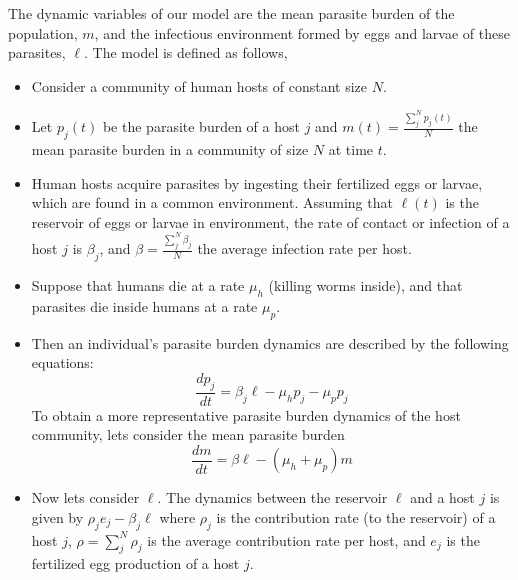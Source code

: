 \documentclass[12pt,a4paper]{article}
\theoremstyle{plain}%
\theoremstyle{definition}
\theoremstyle{remark}
\begin{document}
The dynamic variables of our model are the mean parasite burden of the population, $m$, and the infectious environment formed by eggs and larvae of these parasites, $\ell$.
The model is defined as follows,
\begin{itemize}
	\item Consider a community of human hosts of constant size $N$.
	\item %
	Let $p_j (t)$ be the parasite burden of a host $j$ and
	$m(t)=\frac{\sum^N_j p_j (t)}{N}$ the mean parasite burden in a
	community of size $N$ at time $t$.
	\item Human hosts acquire parasites by ingesting their fertilized eggs or larvae, which are found in a common environment.
	Assuming that $\ell(t)$ is the reservoir of eggs or larvae in environment, the rate of contact or infection of a host $j$ is $\beta_j$, and $\beta=\frac{\sum^N_j \beta_j}{N}$ the average infection rate per host.
	\item Suppose that humans die at a rate $\mu_h$ (killing worms inside), and that parasites die inside humans at a rate $\mu_p$.
	\item Then an individual’s parasite burden dynamics are described by the following equations:
	\begin{equation}
	 \dfrac{dp_j}{dt}=\beta_j \ell - \mu_h p_j - \mu_p p_j
	\end{equation}
	To obtain a more representative parasite burden dynamics of the host community, lets consider the mean parasite burden
	\begin{equation}
	\dfrac{dm}{dt}=\beta \ell - (\mu_h+\mu_p)m
	\end{equation}
	\item Now lets consider $\ell$. 
	The dynamics between the reservoir $\ell$ and a host $j$ is given by
	$\rho_je_j-\beta_j \ell$
	where $\rho_j$ is the contribution rate (to the reservoir) of a host $j$, $\rho=\sum_j^N \rho_j$ is the average contribution rate per host, and $e_j$ is the fertilized egg production of a host $j$.
	

\end{itemize}
\end{document}
